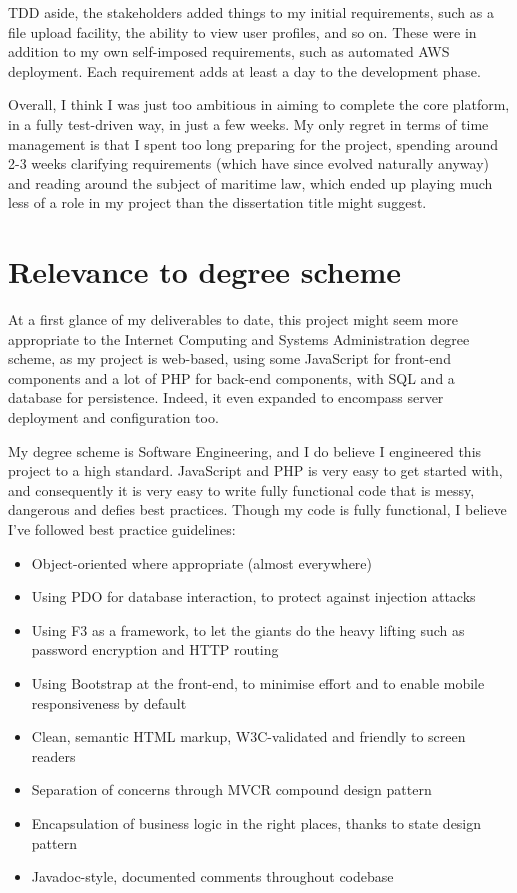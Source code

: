 TDD aside, the stakeholders added things to my initial requirements, such as a file upload facility, the ability to view user profiles, and so on. These were in addition to my own self-imposed requirements, such as automated AWS deployment. Each requirement adds at least a day to the development phase.

Overall, I think I was just too ambitious in aiming to complete the core platform, in a fully test-driven way, in just a few weeks. My only regret in terms of time management is that I spent too long preparing for the project, spending around 2-3 weeks clarifying requirements (which have since evolved naturally anyway) and reading around the subject of maritime law, which ended up playing much less of a role in my project than the dissertation title might suggest.

\section{Relevance to degree scheme}

At a first glance of my deliverables to date, this project might seem more appropriate to the Internet Computing and Systems Administration degree scheme, as my project is web-based, using some JavaScript for front-end components and a lot of PHP for back-end components, with SQL and a database for persistence. Indeed, it even expanded to encompass server deployment and configuration too.

My degree scheme is Software Engineering, and I do believe I engineered this project to a high standard. JavaScript and PHP is very easy to get started with, and consequently it is very easy to write fully functional code that is messy, dangerous and defies best practices. Though my code is fully functional, I believe I've followed best practice guidelines:

\begin{itemize}
\item Object-oriented where appropriate (almost everywhere)
\item Using PDO for database interaction, to protect against injection attacks
\item Using F3 as a framework, to let the giants do the heavy lifting such as password encryption and HTTP routing
\item Using Bootstrap at the front-end, to minimise effort and to enable mobile responsiveness by default
\item Clean, semantic HTML markup, W3C-validated and friendly to screen readers
\item Separation of concerns through MVCR compound design pattern
\item Encapsulation of business logic in the right places, thanks to state design pattern
\item Javadoc-style, documented comments throughout codebase
\end{itemize}

